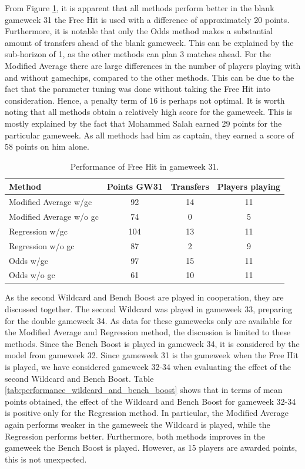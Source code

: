 \newpar 

From Figure \ref{tab:performance_free_hit}, it is apparent that all methods perform better in the blank gameweek 31 the Free Hit is used with a difference of approximately 20 points. Furthermore, it is notable that only the Odds method makes a substantial amount of transfers ahead of the blank gameweek. This can be explained by the sub-horizon of 1, as the other methods can plan 3 matches ahead. For the Modified Average there are large differences in the number of players playing with and without gamechips, compared to the other methods. 
This can be due to the fact that the parameter tuning was done without taking the Free Hit into consideration. Hence, a penalty term of 16 is perhaps not optimal. It is worth noting that all methods obtain a relatively high score for the gameweek. This is mostly explained by the fact that Mohammed Salah earned 29 points for the particular gameweek. As all methods had him as captain, they earned a score of 58 points on him alone.

\begin{table}[H]
\centering
\begin{tabular}{@{}lccc@{}}
\toprule
Method                  & Points GW31 & Transfers  & Players playing \\ \midrule
Modified Average w/gc   & 92          & 14         & 11              \\
Modified Average w/o gc & 74          & 0  & 5               \\
Regression w/gc         & 104         & 13         & 11              \\
Regression w/o gc       & 87          & 2  & 9               \\
Odds w/gc               & 97          & 15         & 11              \\
Odds w/o gc             & 61          & 10  & 11              \\ \bottomrule
\end{tabular}
\caption{Performance of Free Hit in gameweek 31.}
\label{tab:performance_free_hit}
\end{table}


\newpar

As the second Wildcard and Bench Boost are played in cooperation, they are discussed together. The second Wildcard was played in gameweek 33, preparing for the double gameweek 34. As data for these gameweeks only are available for the Modified Average and Regression method, the discussion is limited to these methods. Since the Bench Boost is played in gameweek 34, it is considered by the model from gameweek 32. Since gameweek 31 is the gameweek when the Free Hit is played, we have considered gameweek 32-34 when evaluating the effect of the second Wildcard and Bench Boost. Table \ref{tab:performance_wildcard_and_bench_boost} shows that in terms of mean points obtained, the effect of the Wildcard and Bench Boost for gameweek 32-34 is positive only for the Regression method. In particular, the Modified Average again performs weaker in the gameweek the Wildcard is played, while the Regression performs better. Furthermore, both methods improves in the gameweek the Bench Boost is played. However, as 15 players are awarded points, this is not unexpected.


